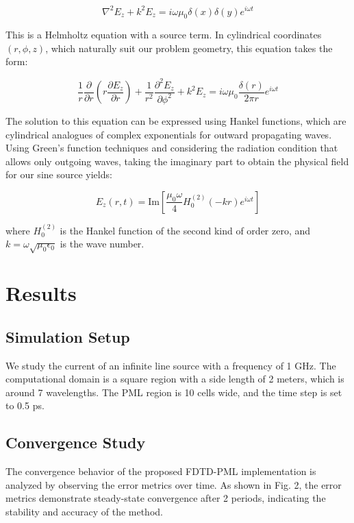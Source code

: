 \documentclass[journal]{IEEEtran}
\begin{document}
\begin{equation}
\nabla^2 E_z + k^2 E_z = i\omega\mu_0\delta(x)\delta(y)e^{i\omega t}
\end{equation}

This is a Helmholtz equation with a source term. In cylindrical coordinates $(r,\phi,z)$, which naturally suit our problem geometry, this equation takes the form:

\begin{equation}
\frac{1}{r}\frac{\partial}{\partial r}\left(r\frac{\partial E_z}{\partial r}\right) + \frac{1}{r^2}\frac{\partial^2 E_z}{\partial \phi^2} + k^2 E_z = i\omega\mu_0\frac{\delta(r)}{2\pi r}e^{i\omega t}
\end{equation}

The solution to this equation can be expressed using Hankel functions, which are cylindrical analogues of complex exponentials for outward propagating waves. Using Green's function techniques and 
considering the radiation condition that allows only outgoing waves, taking the imaginary part to obtain the physical field for our sine source yields:

\begin{equation}
E_z(r,t) = \text{Im}\left[\frac{\mu_0 \omega}{4}H_0^{(2)}(-kr)e^{i\omega t}\right]
\end{equation}

where $H_0^{(2)}$ is the Hankel function of the second kind of order zero, and $k = \omega\sqrt{\mu_0\epsilon_0}$ is the wave number. 




\section{Results}
\subsection{Simulation Setup}
We study the current of an infinite line source with a frequency of 1 GHz. The computational domain is a square region with a side length 
of 2 meters, which is around 7 wavelengths.
The PML region is 10 cells wide, and the time step is set to 0.5 ps. 
\subsection{Convergence Study}
The convergence behavior of the proposed FDTD-PML implementation is analyzed by observing the error metrics over time. As shown in Fig. 2, the error metrics demonstrate steady-state convergence after 2 periods, indicating the stability and accuracy of the method.
\end{document}

